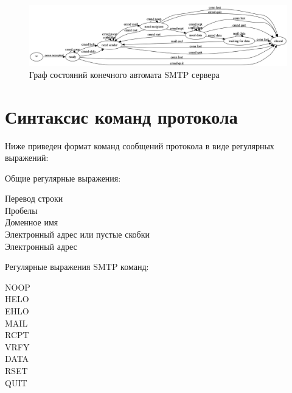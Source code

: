 \documentclass[a4paper,12pt]{report}
\begin{document}
\begin{figure}
    \centering
    \includegraphics[width=\textwidth]{../images/serverfsm_report.png}
    \caption{Граф состояний конечного автомата SMTP сервера}
    \label{fig:serverfsm_report_def}
\end{figure}


\section{Синтаксис команд протокола}
Ниже приведен формат команд сообщений протокола в виде регулярных выражений:

Общие регулярные выражения:
\begin{description}
\item[Перевод строки]

\item[Пробелы]

\item[Доменное имя]

\item[Электронный адрес или пустые скобки]

\item[Электронный адрес]

\end{description}

Регулярные выражения SMTP команд:
\begin{description}
    \item[NOOP]
    
    \item[HELO]
    
    \item[EHLO]
    
    \item[MAIL]
    
    \item[RCPT]
    
    \item[VRFY]
    
    \item[DATA]
    
    \item[RSET]
    
    \item[QUIT]
    
\end{description}
\end{document}
